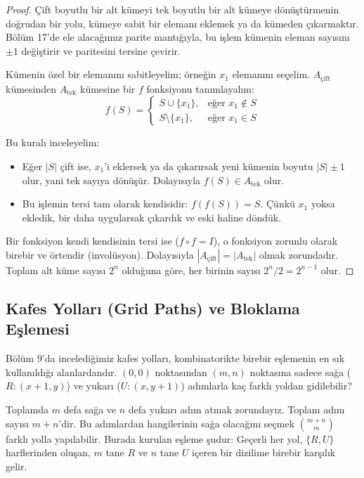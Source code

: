 \begin{proof}
Çift boyutlu bir alt kümeyi tek boyutlu bir alt kümeye dönüştürmenin doğrudan bir yolu, kümeye sabit bir elemanı eklemek ya da kümeden çıkarmaktır. Bölüm 17'de ele alacağımız parite mantığıyla, bu işlem kümenin eleman sayısını $\pm 1$ değiştirir ve paritesini tersine çevirir.

Kümenin özel bir elemanını sabitleyelim; örneğin $x_1$ elemanını seçelim.
$A_{\text{çift}}$ kümesinden $A_{\text{tek}}$ kümesine bir $f$ fonksiyonu tanımlayalım:
\[ f(S) = \begin{cases} 
S \cup \{x_1\}, & \text{eğer } x_1 \notin S \\ 
S \setminus \{x_1\}, & \text{eğer } x_1 \in S 
\end{cases} \]

Bu kuralı inceleyelim:
\begin{itemize}
    \item Eğer $|S|$ çift ise, $x_1$'i eklersek ya da çıkarırsak yeni kümenin boyutu $|S| \pm 1$ olur, yani tek sayıya dönüşür. Dolayısıyla $f(S) \in A_{\text{tek}}$ olur.
    \item Bu işlemin tersi tam olarak kendisidir: $f(f(S)) = S$. Çünkü $x_1$ yoksa ekledik, bir daha uygularsak çıkardık ve eski haline döndük.
\end{itemize}
Bir fonksiyon kendi kendisinin tersi ise ($f \circ f = I$), o fonksiyon zorunlu olarak birebir ve örtendir (involüsyon).
Dolayısıyla $|A_{\text{çift}}| = |A_{\text{tek}}|$ olmak zorundadır. Toplam alt küme sayısı $2^n$ olduğuna göre, her birinin sayısı $2^n / 2 = 2^{n-1}$ olur.
\end{proof}

\subsection{Kafes Yolları (Grid Paths) ve Bloklama Eşlemesi}

Bölüm 9'da incelediğimiz kafes yolları, kombinatorikte birebir eşlemenin en sık kullanıldığı alanlardandır.
$(0,0)$ noktasından $(m,n)$ noktasına sadece sağa ($R: (x+1, y)$) ve yukarı ($U: (x, y+1)$) adımlarla kaç farklı yoldan gidilebilir?

Toplamda $m$ defa sağa ve $n$ defa yukarı adım atmak zorundayız. Toplam adım sayısı $m+n$'dir. Bu adımlardan hangilerinin sağa olacağını seçmek $\binom{m+n}{m}$ farklı yolla yapılabilir. Burada kurulan eşleme şudur: Geçerli her yol, $\{R, U\}$ harflerinden oluşan, $m$ tane $R$ ve $n$ tane $U$ içeren bir dizilime birebir karşılık gelir.

